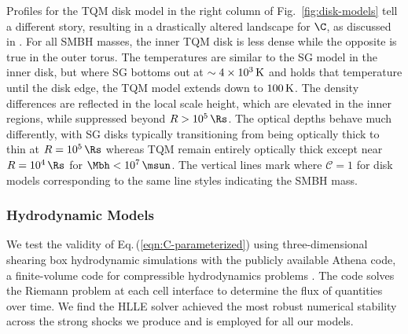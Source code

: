 

Profiles for the TQM disk model in the right column of Fig.~\ref{fig:disk-models} tell a different story, resulting in a drastically altered landscape for $\C$, as discussed in .
For all SMBH masses, the inner TQM disk is less dense while the opposite is true in the outer torus.
The temperatures are similar to the SG model in the inner disk, but where SG bottoms out at $\sim 4 \times 10^3\,\rm{K}$ and holds that temperature until the disk edge, the TQM model extends down to $100\,\rm{K}$.
The density differences are reflected in the local scale height, which are elevated in the inner regions, while suppressed beyond $R>10^5\,\Rs$.
The optical depths behave much differently, with SG disks typically transitioning from being optically thick to thin at $R=10^5\,\Rs$ whereas TQM remain entirely optically thick except near $R=10^4\,\Rs$ for $\Mbh<10^7\,\msun$.
The vertical lines mark where $\mathcal{C}=1$ for disk models corresponding to the same line styles indicating the SMBH mass.


\subsubsection{Hydrodynamic Models}
\label{sec:hydro}

We test the validity of Eq.\,(\ref{eqn:C-parameterized}) using three-dimensional shearing box hydrodynamic simulations with the publicly available Athena code, a finite-volume code for compressible hydrodynamics problems \citep{Stone+08, StoneGardiner10}.
The code solves the Riemann problem at each cell interface to determine the flux of quantities over time.
We find the HLLE solver \citep{Einfeldt+91} achieved the most robust numerical stability across the strong shocks we produce and is employed for all our models.

